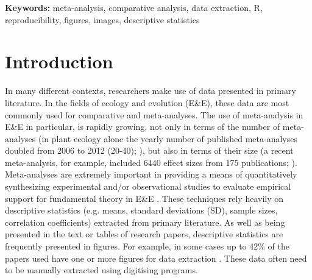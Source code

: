 \documentclass[12pt]{article}
\let\proglang=\textsf
\begin{document}
\vskip10pt
 \textbf{Keywords:} meta-analysis, comparative analysis, data extraction, \proglang{R}, reproducibility, figures, images, descriptive statistics




\clearpage



\section{Introduction}

In many different contexts, researchers make use of data presented in primary literature. In the fields of ecology and evolution (E\&E), these data are most commonly used for comparative and meta-analyses. The use of meta-analysis in E\&E in particular, is rapidly growing, not only in terms of the number of meta-analyses (in plant ecology alone the yearly number of published meta-analyses doubled from 2006 to 2012 (20-40); \cite{Koricheva2014}), but also in terms of their size (a recent meta-analysis, for example, included 6440 effect sizes from 175 publications; \cite{Noble2018}). Meta-analyses are extremely important in providing a means of quantitatively synthesizing experimental and/or observational studies to evaluate empirical support for fundamental theory in E\&E \citep{Gurevitch2018}. These techniques rely heavily on descriptive statistics (e.g. means, standard deviations (SD), sample sizes, correlation coefficients) extracted from primary literature. As well as being presented in the text or tables of research papers, descriptive statistics are frequently presented in figures. For example, in some cases up to 42\% of the papers used have one or more figures for data extraction \citep{Noble2018}. These data often need to be manually extracted using digitising programs. 
\end{document}
